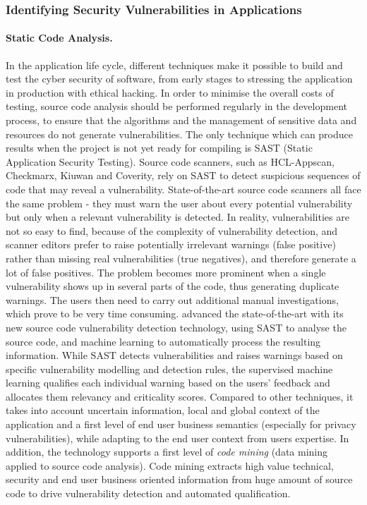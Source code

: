 \documentclass[a4paper,11pt]{article}
\begin{document}
\subsubsection{Identifying Security Vulnerabilities in Applications}
\label{sect:background-first}
\label{sect:identifying}

\paragraph{Static Code Analysis.}
In the application life cycle, different techniques make it possible to build and test the cyber security of software, from early stages to stressing the application in production with ethical hacking. In order to minimise the overall costs of testing, source code analysis should be performed regularly in the development process, to ensure that the algorithms and the management of sensitive data and resources do not generate vulnerabilities. The only technique which can produce results when the project is not yet ready for compiling is SAST (Static Application Security Testing). Source code scanners, such as HCL-Appscan, Checkmarx, Kiuwan and Coverity, rely on SAST to detect suspicious sequences of code that may reveal a vulnerability.
%
State-of-the-art source code scanners all face the same problem - they must warn the user about every potential vulnerability but only when a relevant vulnerability is detected. In reality, vulnerabilities are not so easy to find, because of the complexity of vulnerability detection, and scanner editors prefer to raise potentially irrelevant warnings (false positive) rather than missing real vulnerabilities (true negatives), and therefore generate a lot of false positives. The problem becomes more prominent when a single vulnerability shows up in several parts of the code, thus generating duplicate warnings. The users then need to carry out additional manual investigations, which prove to be very time consuming. 
%
\YAGshort{} advanced the state-of-the-art with its new source code vulnerability detection technology, using SAST to analyse the source code, and machine learning to automatically process the resulting information. While SAST detects vulnerabilities and raises warnings based on specific vulnerability modelling and detection rules, the supervised machine learning qualifies each individual warning based on the users' feedback and allocates them relevancy and criticality scores. Compared to other techniques, it takes into account uncertain information, local and global context of the application and a first level of end user business semantics (especially for privacy vulnerabilities), while adapting to the end user context from users expertise. In addition, the technology supports a first level of \emph{code mining} (data mining applied to source code analysis). Code mining extracts high value technical, security and end user business oriented information from huge amount of source code to drive vulnerability detection and automated qualification.
\end{document}
